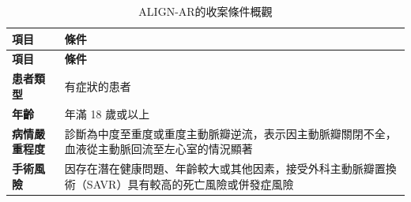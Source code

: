 \documentclass[nols]{tufte-book}
\begin{document}
\begin{longtable}{p{3cm} p{7cm}}
\caption{ALIGN-AR的收案條件概觀}
\hline
\textbf{項目} & \textbf{條件} \\ \hline
\endfirsthead
\hline
\textbf{項目} & \textbf{條件} \\ \hline
\endhead
\hline
\endfoot
\textbf{患者類型} & 有症狀的患者 \\ \hline
\textbf{年齡} & 年滿 18 歲或以上 \\ \hline
\textbf{病情嚴重程度} & 診斷為中度至重度或重度主動脈瓣逆流，表示因主動脈瓣關閉不全，血液從主動脈回流至左心室的情況顯著 \\ \hline
\textbf{手術風險} & 因存在潛在健康問題、年齡較大或其他因素，接受外科主動脈瓣置換術（SAVR）具有較高的死亡風險或併發症風險 \\ \hline
\end{longtable}
\end{document}

